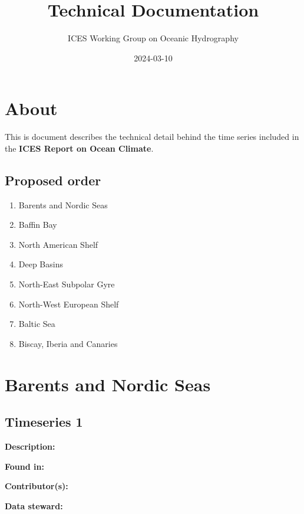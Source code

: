 \documentclass[
]{book}
\title{Technical Documentation}
\author{ICES Working Group on Oceanic Hydrography}
\date{2024-03-10}
\providecommand{\tightlist}{%
  \setlength{\itemsep}{0pt}\setlength{\parskip}{0pt}}
\begin{document}
\maketitle

{
\setcounter{tocdepth}{1}
\tableofcontents
}
\hypertarget{about}{%
\chapter*{About}\label{about}}

This is document describes the technical detail behind the time series included in the \textbf{ICES Report on Ocean Climate}.

\hypertarget{proposed-order}{%
\section*{Proposed order}\label{proposed-order}}

\begin{enumerate}
\def\labelenumi{\arabic{enumi}.}
\tightlist
\item
  Barents and Nordic Seas
\item
  Baffin Bay
\item
  North American Shelf
\item
  Deep Basins
\item
  North-East Subpolar Gyre
\item
  North-West European Shelf
\item
  Baltic Sea
\item
  Biscay, Iberia and Canaries
\end{enumerate}

\hypertarget{barents-and-nordic-seas}{%
\chapter{Barents and Nordic Seas}\label{barents-and-nordic-seas}}

\hypertarget{timeseries-1}{%
\section{Timeseries 1}\label{timeseries-1}}

\textbf{Description:}

\textbf{Found in:}

\textbf{Contributor(s):}

\textbf{Data steward:}
\end{document}
